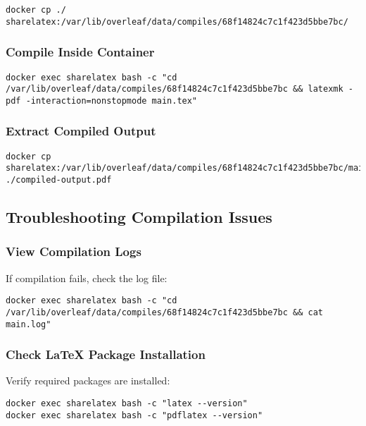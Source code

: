 \begin{verbatim}
docker cp ./ sharelatex:/var/lib/overleaf/data/compiles/68f14824c7c1f423d5bbe7bc/
\end{verbatim}

\subsubsection{Compile Inside Container}

\begin{verbatim}
docker exec sharelatex bash -c "cd /var/lib/overleaf/data/compiles/68f14824c7c1f423d5bbe7bc && latexmk -pdf -interaction=nonstopmode main.tex"
\end{verbatim}

\subsubsection{Extract Compiled Output}

\begin{verbatim}
docker cp sharelatex:/var/lib/overleaf/data/compiles/68f14824c7c1f423d5bbe7bc/main.pdf ./compiled-output.pdf
\end{verbatim}

\subsection{Troubleshooting Compilation Issues}

\subsubsection{View Compilation Logs}

If compilation fails, check the log file:

\begin{verbatim}
docker exec sharelatex bash -c "cd /var/lib/overleaf/data/compiles/68f14824c7c1f423d5bbe7bc && cat main.log"
\end{verbatim}

\subsubsection{Check LaTeX Package Installation}

Verify required packages are installed:

\begin{verbatim}
docker exec sharelatex bash -c "latex --version"
docker exec sharelatex bash -c "pdflatex --version"
\end{verbatim}

